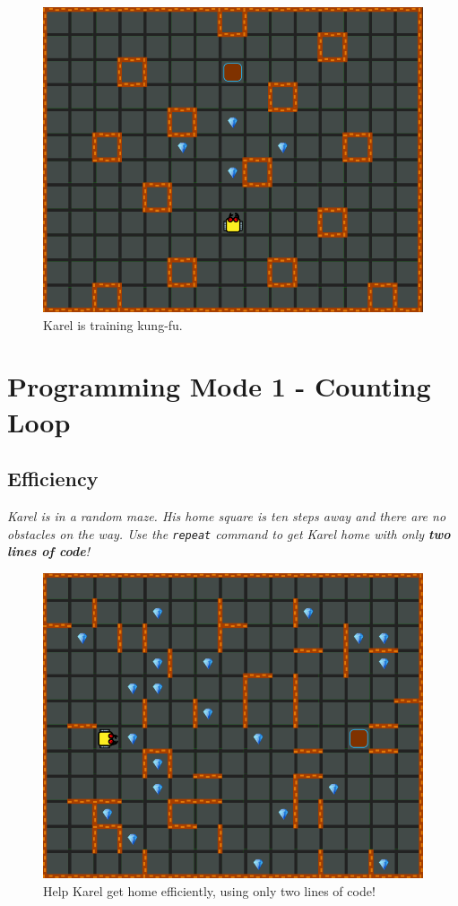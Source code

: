 \begin{figure}[!ht]
\begin{center}
\includegraphics[height=0.4\textwidth]{img/a19.png}
\end{center}
\vspace{-4mm}
\caption{Karel is training kung-fu.}
\label{fig:b06}
\vspace{-10mm}
\end{figure}


\setcounter{section}{4}
\section{Programming Mode 1 - Counting Loop}

\subsection{Efficiency}

{\em Karel is in a random maze. His home square is ten steps away and there are no obstacles on the way. Use the {\tt repeat} command to get Karel home with only {\bf two lines of code}!}\\[-7mm]

\begin{figure}[!ht]
\begin{center}
\includegraphics[height=0.4\textwidth]{img/c01.png}
\end{center}
\vspace{-4mm}
\caption{Help Karel get home efficiently, using only two lines of code!}
\label{fig:c01}
\vspace{-1cm}
\end{figure}


